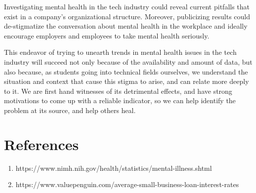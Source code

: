 \documentclass[notitlepage, 11pt]{report}
\begin{document}
Investigating mental health in the tech industry could reveal current pitfalls
that exist in a company's organizational structure. Moreover, publicizing results
could de-stigmatize the conversation about mental health in the workplace and 
ideally encourage employers and employees to take mental health seriously. 

This endeavor of trying to unearth trends in mental health issues in the tech 
industry will succeed not only because of the availability and amount of data, 
but also because, as students going into technical fields ourselves, we 
understand the situation and context that cause this stigma to arise, and can 
relate more deeply to it. We are first hand witnesses of its detrimental effects, 
and have strong motivations to come up with a reliable indicator, so we can help
identify the problem at its source, and help others heal. 

\section{References}
\small
\begin{enumerate}
    \itemsep-0.7em
    \item https://www.nimh.nih.gov/health/statistics/mental-illness.shtml
    \item https://www.valuepenguin.com/average-small-business-loan-interest-rates
\end{enumerate}
\end{document}
